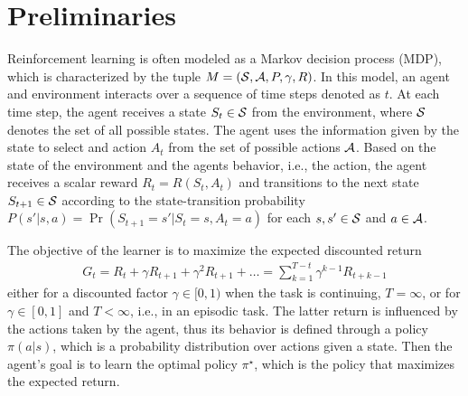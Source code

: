 \section{Preliminaries}
Reinforcement learning is often modeled as a Markov decision process (MDP), which is characterized by the tuple $M = (\mathcal{S}, \mathcal{A}, P, \gamma, R)$. In this model, an agent and environment interacts over a sequence of time steps denoted as $t$. At each time step, the agent receives a state $S_t \in \mathcal{S}$ from the environment, where $\mathcal{S}$ denotes the set of all possible states. The agent uses the information given by the state to select and action $A_t$ from the set of possible actions $\mathcal{A}$. Based on the state of the environment and the agents behavior, i.e., the action, the agent receives a scalar reward $R_t = R(S_t,A_t)$ and transitions to the next state $S_{t+1} \in \mathcal{S}$ according to the state-transition probability $P(s'|s,a) = \Pr(S_{t+1} = s' | S_t = s, A_t = a)$ for each $s,s' \in \mathcal{S}$ and $a \in \mathcal{A}$.

The objective of the learner is to maximize the expected discounted return
\begin{align*}
    G_t = R_{t} + \gamma R_{t+1} + \gamma^2 R_{t+1} + \dots = \sum_{k=1}^{T-t} \gamma^{k-1} R_{t+k-1}
\end{align*}
either for a discounted factor $\gamma \in [0,1)$ when the task is continuing, $T = \infty$, or for $\gamma \in [0,1]$ and $T < \infty$, i.e., in an episodic task. The latter return is influenced by the actions taken by the agent, thus its behavior is defined through a policy $\pi (a|s)$, which is a probability distribution over actions given a state. Then the agent's goal is to learn the optimal policy $\pi^\star$, which is the policy that maximizes the expected return.

